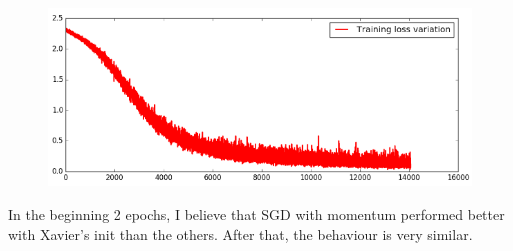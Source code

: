 \documentclass{article}
\begin{document}
\begin{flushleft}
\begin{figure}[H]
\centering
\includegraphics[width=0.485\linewidth]{default_init.png}
\end{figure}

In the beginning 2 epochs, I believe that SGD with momentum performed better with Xavier's init than the others. After that, the behaviour is very similar.
\end{flushleft}
\end{document}
